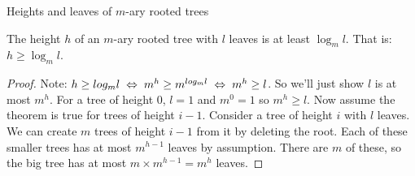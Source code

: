 \begin{frame}{Heights and leaves of $m$-ary rooted trees}
  \begin{theorem}
    The height $h$ of an $m$-ary rooted tree with $l$ leaves is at least $\log_m l$.
    That is: $h \geq \log_m l$.
  \end{theorem}
  \begin{proof}
    Note: $h \geq log_m l \hspace{0.1cm} \Leftrightarrow \hspace{0.1cm} m^h \geq m^{log_m l} \hspace{0.1cm} \Leftrightarrow \hspace{0.1cm} m^h \geq l$.
    So we'll just show $l$ is at most $m^h$.
    For a tree of height 0, $l = 1$ and $m^0 = 1$ so $m^h \geq l$.
    Now assume the theorem is true for trees of height $i-1$.
    Consider a tree of height $i$ with $l$ leaves.
    We can create $m$ trees of height $i-1$ from it by deleting the root.
    Each of these smaller trees has at most $m^{h-1}$ leaves by assumption.
    There are $m$ of these, so the big tree has at most $m \times m^{h-1} = m^h$ leaves.
  \end{proof}
\end{frame}

